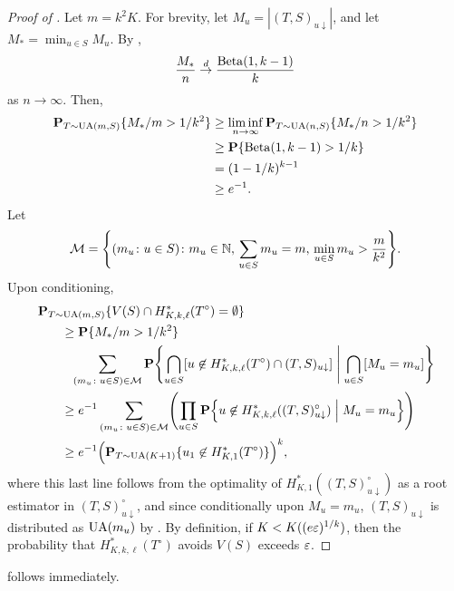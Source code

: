 \begin{proof}[Proof of ]
  Let $m = k^2 K$. For brevity, let $M_u = |(T, S)_{u \downarrow}|$,
  and let $M_* = \min_{u \in S} M_u$. By ,
  \[
    \frac{M_*}{n} \overset{d}{\to} \frac{\operatorname{Beta}(1, k - 1)}{k}
  \]
  as $n \to \infty$. Then,
  \begin{align*}
    \operatorname{\mathbf{P}}_{T \sim \operatorname{UA}(m, S)} \{M_*/m > 1/k^2\} &\ge \liminf_{n \to \infty} \operatorname{\mathbf{P}}_{T \sim \operatorname{UA}(n, S)} \{M_*/n > 1/k^2\} \\
                                             &\ge \operatorname{\mathbf{P}}\{\operatorname{Beta}(1, k - 1) > 1/k\} \\
                                             &= (1 - 1/k)^{k - 1} \\
                                             &\ge e^{-1} .
  \end{align*}
  Let
  \[
    \sM = \left\{(m_u \colon u \in S) \colon m_u \in \N, \, \sum_{u \in S} m_u = m, \, \min_{u \in S} m_u > \frac{m}{k^2} \right\} .
  \]
  Upon conditioning,
  \begin{align*}
    &\Pr_{T \sim \UA(m, S)} \{V(S) \cap H_{K, k, \ell}^*(T^\circ) = \emptyset\} \\
    &\qquad \ge \Pr\{M_*/m > 1/k^2\} \\
    &\qquad \hphantom{\ge} \sum_{(m_u \colon u \in S) \in \sM} \Pr\left\{\bigcap_{u \in S} [u \not\in H_{K, k, \ell}^*(T^\circ) \cap (T, S)_{u \downarrow}] \; \middle| \; \bigcap_{u \in S} [M_u = m_u]\right\} \\
    &\qquad \ge e^{-1} \sum_{(m_u \colon u \in S) \in \sM} \left(\prod_{u \in S} \Pr\Bigl\{u \not\in H_{K, k, \ell}^*((T, S)_{u \downarrow}^\circ) \mathrel{\Big|} M_u = m_u \Bigr\} \right) \\
    &\qquad \ge e^{-1} \Bigl(\Pr_{T \sim \UA(K + 1)} \{u_1 \not\in H_{K, 1}^*(T^\circ)\}\Bigr)^k ,
  \end{align*}
  where this last line follows from the optimality of
  $H^*_{K, 1}((T, S)_{u \downarrow}^\circ)$ as a root estimator in
  $(T, S)_{u \downarrow}^\circ$, and since conditionally upon
  $M_u = m_u$, $(T, S)_{u \downarrow}$ is distributed as $\operatorname{UA}(m_u)$ by
  . By definition, if
  $K < K((e \varepsilon)^{1/k})$, then the probability that
  $H^*_{K, k, \ell}(T^\circ)$ avoids $V(S)$ exceeds $\varepsilon$.
\end{proof}

 follows immediately.
